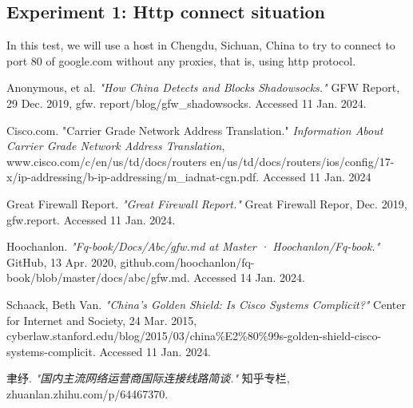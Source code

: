 \documentclass[11pt]{article}
\begin{document}
\subsection{Experiment 1: Http connect situation}
In this test, we will use a host in Chengdu, Sichuan, China to try to connect to
port 80 of google.com without any proxies, that is, using http protocol.
\newpage

\begin{thebibliography}{9}
	 Anonymous, et al. \textit{"How China Detects
		and Blocks Shadowsocks."} GFW Report, 29 Dec. 2019, gfw.
	report/blog/gfw\_shadowsocks. Accessed 11 Jan. 2024.

	 Cisco.com. "Carrier Grade Network Address Translation."
	\textit{Information About Carrier Grade Network Address Translation}, www.cisco.com/c/en/us/td/docs/routers
	en/us/td/docs/routers/ios/config/17-x/ip-addressing/b-ip-addressing/m\_iadnat-cgn.pdf. Accessed 11 Jan. 2024

	 Great Firewall Report. \textit{"Great Firewall Report."}
	Great Firewall Repor, Dec. 2019, gfw.report. Accessed 11 Jan. 2024.

	 Hoochanlon. \textit{"Fq-book/Docs/Abc/gfw.md at Master ·
		Hoochanlon/Fq-book."} GitHub, 13 Apr. 2020, github.com/hoochanlon/fq-book/blob/master/docs/abc/gfw.md. Accessed 14 Jan. 2024.

	Schaack, Beth Van. \textit{"China's Golden Shield: Is Cisco Systems Complicit?"} Center
	for Internet and Society, 24 Mar. 2015, cyberlaw.stanford.edu/blog/2015/03/china\%E2\%80\%99s-golden-shield-cisco-systems-complicit.
	Accessed 11 Jan. 2024.

	聿纾. \textit{"国内主流网络运营商国际连接线路简谈."} 知乎专栏, zhuanlan.zhihu.com/p/64467370.

\end{thebibliography}
\end{document}
